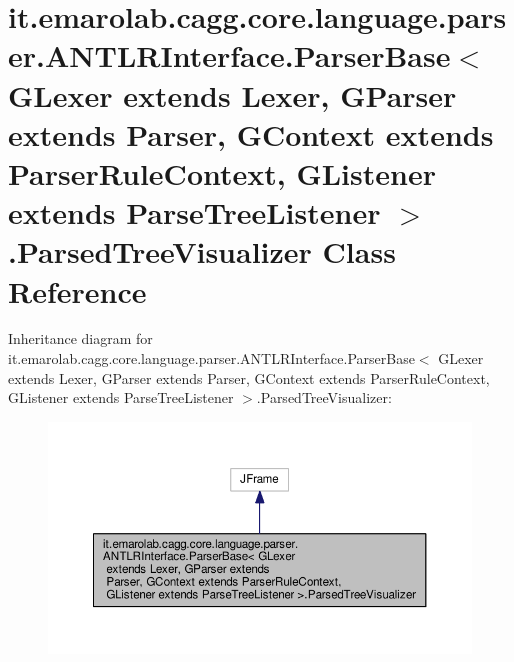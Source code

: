\hypertarget{classit_1_1emarolab_1_1cagg_1_1core_1_1language_1_1parser_1_1ANTLRInterface_1_1ParserBase_3_01GL87e2703206e8c51ae32fa157d66066a1}{\section{it.\-emarolab.\-cagg.\-core.\-language.\-parser.\-A\-N\-T\-L\-R\-Interface.\-Parser\-Base$<$ G\-Lexer extends Lexer, G\-Parser extends Parser, G\-Context extends Parser\-Rule\-Context, G\-Listener extends Parse\-Tree\-Listener $>$.Parsed\-Tree\-Visualizer Class Reference}
\label{classit_1_1emarolab_1_1cagg_1_1core_1_1language_1_1parser_1_1ANTLRInterface_1_1ParserBase_3_01GL87e2703206e8c51ae32fa157d66066a1}
}


Inheritance diagram for it.\-emarolab.\-cagg.\-core.\-language.\-parser.\-A\-N\-T\-L\-R\-Interface.\-Parser\-Base$<$ G\-Lexer extends Lexer, G\-Parser extends Parser, G\-Context extends Parser\-Rule\-Context, G\-Listener extends Parse\-Tree\-Listener $>$.Parsed\-Tree\-Visualizer\-:\nopagebreak
\begin{figure}[H]
\begin{center}
\leavevmode
\includegraphics[width=350pt]{classit_1_1emarolab_1_1cagg_1_1core_1_1language_1_1parser_1_1ANTLRInterface_1_1ParserBase_3_01GLe555ad35107daa476c0eaa53b18f6750}
\end{center}
\end{figure}


